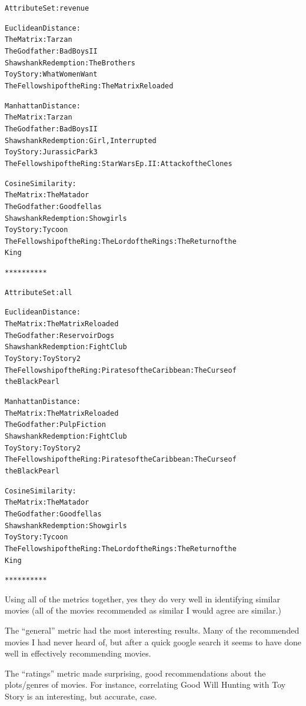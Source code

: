 \documentclass[letterpaper,10pt,english]{/usr/local/lib/python2.7/dist-packages/sphinx/texinputs/sphinxhowto}
\newenvironment{InvisibleVerbatim}
        {\begin{mdframed}[leftmargin=0.1\linewidth,innerleftmargin=3pt,innerrightmargin=3pt, userdefinedwidth=1\linewidth, linewidth=0pt, linecolor=white, usetwoside=false]}
        {\end{mdframed}}
\begin{document}
\begin{InvisibleVerbatim}
\begin{alltt}
Attribute Set: revenue

Euclidean Distance:
  The Matrix : Tarzan
  The Godfather : Bad Boys II
  Shawshank Redemption : The Brothers
  Toy Story : What Women Want
  The Fellowship of the Ring: The Matrix Reloaded

Manhattan Distance:
  The Matrix : Tarzan
  The Godfather : Bad Boys II
  Shawshank Redemption : Girl, Interrupted
  Toy Story : Jurassic Park 3
  The Fellowship of the Ring: Star Wars Ep. II: Attack of the Clones

Cosine Similarity:
  The Matrix : The Matador
  The Godfather : Goodfellas
  Shawshank Redemption : Showgirls
  Toy Story : Tycoon
  The Fellowship of the Ring: The Lord of the Rings: The Return of the
King

**********

Attribute Set: all

Euclidean Distance:
  The Matrix : The Matrix Reloaded
  The Godfather : Reservoir Dogs
  Shawshank Redemption : Fight Club
  Toy Story : Toy Story 2
  The Fellowship of the Ring: Pirates of the Caribbean: The Curse of
the Black Pearl

Manhattan Distance:
  The Matrix : The Matrix Reloaded
  The Godfather : Pulp Fiction
  Shawshank Redemption : Fight Club
  Toy Story : Toy Story 2
  The Fellowship of the Ring: Pirates of the Caribbean: The Curse of
the Black Pearl

Cosine Similarity:
  The Matrix : The Matador
  The Godfather : Goodfellas
  Shawshank Redemption : Showgirls
  Toy Story : Tycoon
  The Fellowship of the Ring: The Lord of the Rings: The Return of the
King

**********

\end{alltt}

            \end{InvisibleVerbatim}
            
        
    
Using all of the metrics together, yes they do very well in identifying
similar movies (all of the movies recommended as similar I would agree
are similar.)

The ``general'' metric had the most interesting results. Many of the
recommended movies I had never heard of, but after a quick google search
it seems to have done well in effectively recommending movies.

The ``ratings'' metric made surprising, good recommendations about the
plots/genres of movies. For instance, correlating Good Will Hunting with
Toy Story is an interesting, but accurate, case.
\end{document}
